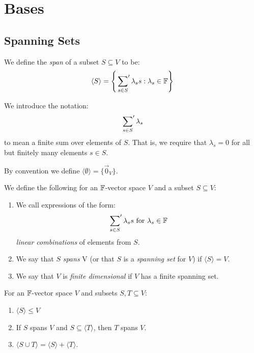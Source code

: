 \documentclass[../main.tex]{subfiles}
\begin{document}
\chapter{Bases}
\section{Spanning Sets}
\begin{definition}[Span]
  We define the \textit{span} of a subset $S \subseteq V$ to be:
  \[
    \langle S \rangle = \left\{\sideset{}{'}\sum_{s \in S} \lambda_s s: \lambda_s \in \mathbb{F}\right\}
  \]
\end{definition}
\begin{remark}[Notation]
  We introduce the notation:
  \[
    \sideset{}{'}\sum_{s \in S} \lambda_s
  \]
  to mean a finite sum over elements of $S$.
  That is, we require that $\lambda_s = 0$ for all but finitely many elements $s \in S$.
\end{remark}
\begin{remark}
  By convention we define $\langle \emptyset \rangle = \{\vec{0}_{V}\}$.
\end{remark}
\begin{definition}
We define the following for an $\mathbb{F}$-vector space $V$ and a subset $S \subseteq V$:
  \begin{enumerate}
    \item We call expressions of the form:
      \[
        \sideset{}{'}\sum_{s \in S} \lambda_s s \text{ for } \lambda_s \in \mathbb{F}
      \]
      \textit{linear combinations} of elements from $S$.
    \item We say that $S$ \textit{spans} V (or that $S$ is a \textit{spanning set} for $V$) if $\langle S \rangle = V$.
    \item We say that $V$ is \textit{finite dimensional} if $V$ has a finite spanning set.
  \end{enumerate}
\end{definition}
\begin{lemma}
  For an $\mathbb{F}$-vector space $V$ and subsets $S, T \subseteq V$: \label{spanningLemma}
  \begin{enumerate}
    \item $\langle S \rangle \leq V$
    \item If $S$ spans $V$ and $S \subseteq \langle T \rangle$, then $T$ spans $V$.
    \item $\langle S \cup T \rangle = \langle S \rangle + \langle T \rangle$.
  \end{enumerate}
\end{lemma}
\end{document}
